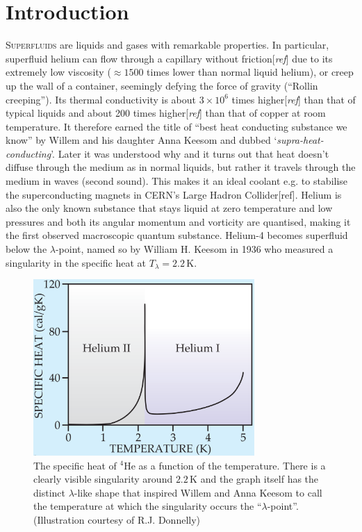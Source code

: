 \documentclass[12pt,a4paper,twosides]{book}
\newcommand{\unit}[1]{\,\mathrm{#1}}
\begin{document}
\tableofcontents

\chapter{Introduction}
	\lettrine[lines=3,findent=3pt,nindent=0pt]{S}{uperfluids} are liquids and gases with remarkable properties. In particular, superfluid helium can flow through a capillary without friction[\emph{ref}] due to its extremely low viscosity\citep{Balibar2017} ($\approx\!1500$ times lower than normal liquid helium), or creep up the wall of a container, seemingly defying the force of gravity\citep{Rollin1939} (``Rollin creeping''). Its thermal conductivity is about $3\times10^6$ times higher[\emph{ref}] than that of typical liquids and about 200 times higher[\emph{ref}] than that of copper at room temperature\citep{Keesom1936,Allen1937}. It therefore earned the title of ``best heat conducting substance we know'' by Willem and his daughter Anna Keesom and dubbed `\emph{supra-heat-conducting}'\citep{Keesom1936}. Later it was understood why\citep{Tisza1938-1,Tisza1938-2,Tisza1940-1,Tisza1940-2} and it turns out that heat doesn't diffuse through the medium as in normal liquids, but rather it travels through the medium in waves (second sound). This makes it an ideal coolant e.g. to stabilise the superconducting magnets in CERN's Large Hadron Collider[ref]. Helium is also the only known substance that stays liquid at zero temperature and low pressures and both its angular momentum and vorticity are quantised, making it the first observed macroscopic quantum substance. Helium-4 becomes superfluid below the $\lambda$-point, named so by William H. Keesom in 1936 who measured a singularity in the specific heat at $T_\lambda=2.2\unit{K}$\citep{Keesom1936}.
	
	\begin{figure}[t]
		\begin{center}
			\includegraphics[width=0.75\textwidth]{specific-heat}
		\end{center}
		\caption{The specific heat of $^4$He as a function of the temperature. There is a clearly visible singularity around $2.2\unit{K}$ and the graph itself has the distinct $\lambda$-like shape that inspired Willem and Anna Keesom to call the temperature at which the singularity occurs the ``$\lambda$-point''. (Illustration courtesy of R.J. Donnelly\citep{Donnelly2009})}
		\label{fig:specific-heat}
	\end{figure}	
	
\end{document}
